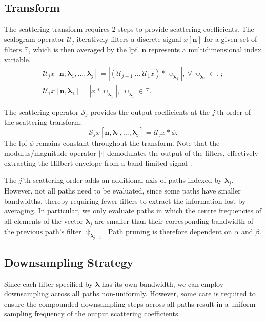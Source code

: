 \documentclass[journal]{IEEEtran}
\newcommand{\vect}[1]{\boldsymbol{\mathbf{#1}}}
\begin{document}
\subsection{Transform}

The scattering transform requires 2 steps to provide scattering coefficients. The scalogram operator $\mathcal{U}_j$ iteratively filters a discrete signal $x[\vect{n}]$ for a given set of filters $\mathbb{F}$, which is then averaged by the \ac{lpf}. $\vect{n}$ represents a multidimensional index variable.
\begin{gather}
    \mathcal{U}_j x [\vect{n}, \vect{\lambda}_1, ..., \vect{\lambda}_j] = \left|\left(\mathcal{U}_{j-1} \ ...\  \mathcal{U}_1 x\right) * \uppsi_{\vect{\lambda}_j} \right|, \ \forall \ \uppsi_{\vect{\lambda}_j} \in \mathbb{F}; \\
     \mathcal{U}_1 x [\vect{n}, \vect{\lambda}_1] =  \left| x * \uppsi_{\vect{\lambda}_1} \right| , \ \uppsi_{\vect{\lambda}_1} \in \mathbb{F}.
\end{gather}

The scattering operator $\mathcal{S}_j$ provides the output coefficients at the $j$'th order of the scattering transform:
\begin{equation}
    \mathcal{S}_j x[\vect{n}, \vect{\lambda}_1, ..., \vect{\lambda}_j] = \mathcal{U}_j x * \phi.
\end{equation}
The \ac{lpf} $\phi$ remains constant throughout the transform. Note that the modulus/magnitude operator $|\cdot|$ demodulates the output of the filters, effectively extracting the Hilbert envelope from a band-limited signal \cite{waveletsandsubbandcoding}. 

The $j$'th scattering order adds an additional axis of paths indexed by $\vect{\lambda}_j$. However, not all paths need to be evaluated, since some paths have smaller bandwidths, thereby requiring fewer filters to extract the information lost by averaging. In particular, we only evaluate paths in which the centre frequencies of all elements of the vector $\vect{\lambda}_{j}$ are smaller than their corresponding bandwidth of the previous path's filter $\uppsi_{\vect{\lambda}_{j-1}}$. Path pruning is therefore dependent on $\alpha$ and $\beta$.

\subsection{Downsampling Strategy}
Since each filter specified by $\vect{\lambda}$ has its own bandwidth, we can employ downsampling across all paths non-uniformly. However, some care is required to ensure the compounded downsampling steps across all paths result in a uniform sampling frequency of the output scattering coefficients.
\end{document}
